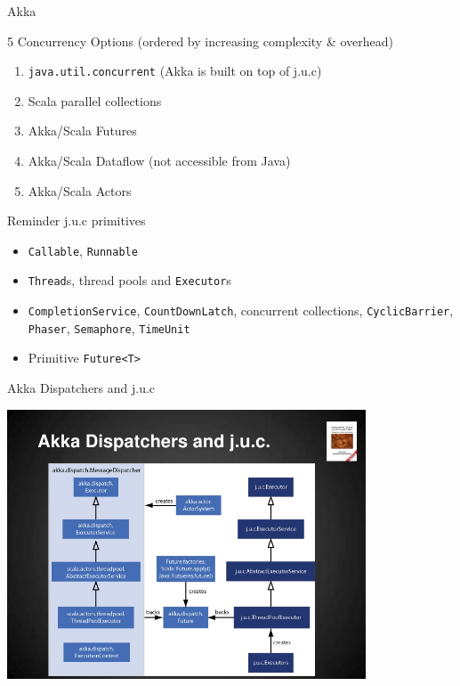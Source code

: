 \begin{frame}[fragile]{Akka}
\begin{block}{5 Concurrency Options (ordered by increasing complexity \& overhead)}
\begin{enumerate}
  \item \lstinline!java.util.concurrent! (Akka is built on top of j.u.c)
  \item Scala parallel collections
  \item Akka/Scala Futures
  \item Akka/Scala Dataflow (not accessible from Java)
  \item Akka/Scala Actors
\end{enumerate}
\end{block}
\pause
\begin{block}{Reminder j.u.c primitives}
\begin{itemize}
  \item \lstinline!Callable!, \lstinline!Runnable!
  \item \lstinline!Thread!s, thread pools and \lstinline!Executor!s
  \item \lstinline!CompletionService!, \lstinline!CountDownLatch!, concurrent
  collections, \lstinline!CyclicBarrier!, \lstinline!Phaser!,
  \lstinline!Semaphore!, \lstinline!TimeUnit!
  \item Primitive \lstinline!Future<T>!
\end{itemize}
\end{block}
\end{frame}

\begin{frame}{Akka Dispatchers and j.u.c}
\begin{center}
\includegraphics[width = 0.8\textwidth]{resources/JUC.jpg}
\end{center}
\end{frame}


